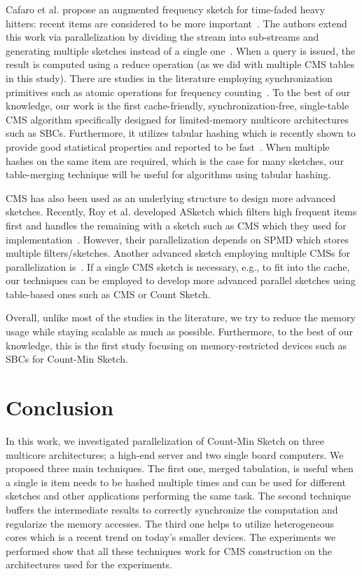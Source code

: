 \documentclass[10pt, review=true,sigconf]{acmart}
\begin{document}
Cafaro et al. propose an augmented frequency sketch for time-faded heavy hitters: recent items are considered to be more important~\cite{cafaro2016}. The authors extend this work via parallelization by dividing the stream into sub-streams and generating multiple sketches instead of a single one~\cite{cafaro2018}. When a query is issued, the result is computed using a reduce operation (as we did with multiple CMS tables in this study). There are studies in the literature employing synchronization primitives such as atomic operations for frequency counting~\cite{Das2009}. To the best of our knowledge, our work is the first cache-friendly, synchronization-free, single-table CMS algorithm specifically designed for limited-memory multicore architectures such as SBCs. Furthermore, it utilizes tabular hashing which is recently shown to provide good statistical properties and reported to be fast~\cite{thorup2017,Dahlgaard2017}. When multiple hashes on the same item are required, which is the case for many sketches, our table-merging technique will be useful for algorithms using tabular hashing. 

CMS has also been used as an underlying structure to design more advanced sketches. Recently, Roy et al. developed ASketch which filters high frequent items first and handles the remaining with a sketch such as CMS which they used for implementation~\cite{roy2016}. However, their parallelization depends on SPMD which stores multiple filters/sketches. Another advanced sketch employing multiple CMSs for parallelization is~\cite{Thomas2007}. If a single CMS sketch is necessary, e.g., to fit into the cache, our techniques can be employed to develop more advanced parallel sketches using table-based ones such as CMS or Count Sketch.

Overall, unlike most of the studies in the literature, we try to reduce the memory usage while staying scalable as
much as possible. Furthermore, to the best of our knowledge, this is the first study focusing on 
memory-restricted devices  such as SBCs for Count-Min Sketch.  

\section{Conclusion}\label{sec:con}

In this work, we investigated parallelization of Count-Min Sketch on three multicore architectures; a high-end server and two single board computers. We proposed three main techniques. The first one, merged tabulation, is useful when a single is item needs to be hashed multiple times and can be used for different sketches and other applications performing the same task. The second technique buffers the intermediate results to correctly synchronize the computation and regularize the memory accesses. The third one helps to utilize heterogeneous cores which is a recent trend on today's smaller devices. The experiments we performed show that all these techniques work for CMS construction on the architectures used for the experiments.
\end{document}

